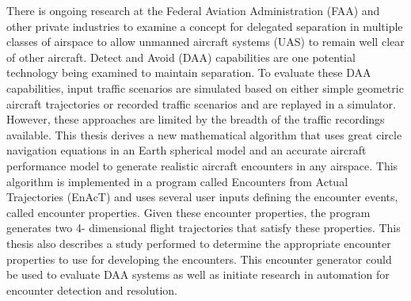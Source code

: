 
\indent There is ongoing research at the Federal Aviation Administration (FAA) and
other private industries to examine a concept for delegated separation in multiple classes
of airspace to allow unmanned aircraft systems (UAS) to remain well clear of other
aircraft. Detect and Avoid (DAA) capabilities are one potential technology being
examined to maintain separation. To evaluate these DAA capabilities, input traffic
scenarios are simulated based on either simple geometric aircraft trajectories or recorded
traffic scenarios and are replayed in a simulator. However, these approaches are limited
by the breadth of the traffic recordings available. This thesis derives a new mathematical
algorithm that uses great circle navigation equations in an Earth spherical model and an
accurate aircraft performance model to generate realistic aircraft encounters in any
airspace. This algorithm is implemented in a program called Encounters from Actual
Trajectories (EnAcT) and uses several user inputs defining the encounter events, called
encounter properties. Given these encounter properties, the program generates two 4-
dimensional flight trajectories that satisfy these properties. This thesis also describes a
study performed to determine the appropriate encounter properties to use for developing
the encounters. This encounter generator could be used to evaluate DAA systems as well
as initiate research in automation for encounter detection and resolution.

